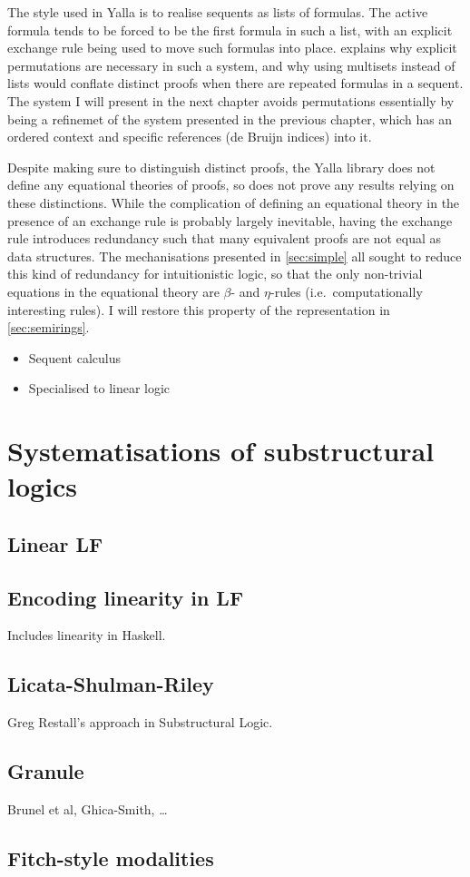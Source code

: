 The style used in Yalla is to realise sequents as lists of formulas.
The active formula tends to be forced to be the first formula in such a list,
with an explicit exchange rule being used to move such formulas into place.
 explains why explicit permutations are necessary in such a
system, and why using multisets instead of lists would conflate distinct proofs
when there are repeated formulas in a sequent.
The system I will present in the next chapter avoids permutations essentially by
being a refinemet of the system presented in the previous chapter, which has an
ordered context and specific references (de Bruijn indices) into it.

Despite making sure to distinguish distinct proofs, the Yalla library does not
define any equational theories of proofs, so does not prove any results relying
on these distinctions.
While the complication of defining an equational theory in the presence of an
exchange rule is probably largely inevitable, having the exchange rule
introduces redundancy such that many equivalent proofs are not equal as data
structures.
The mechanisations presented in \cref{sec:simple} all sought to reduce this kind
of redundancy for intuitionistic logic, so that the only non-trivial equations
in the equational theory are $\beta$- and $\eta$-rules (i.e.\ computationally
interesting rules).
I will restore this property of the representation in \cref{sec:semirings}.

\begin{itemize}
  \item Sequent calculus
  \item Specialised to linear logic
\end{itemize}

\section{Systematisations of substructural logics}

\subsection{Linear LF}

\subsection{Encoding linearity in LF}

Includes linearity in Haskell.

\subsection{Licata-Shulman-Riley}

Greg Restall's approach in Substructural Logic.

\subsection{Granule}

Brunel et al, Ghica-Smith, \ldots

\subsection{Fitch-style modalities}
